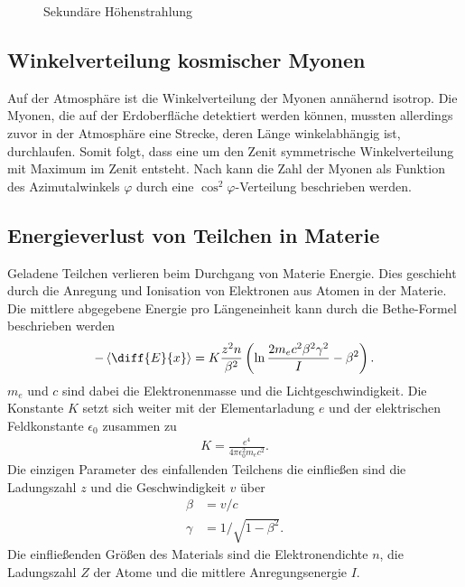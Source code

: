 \begin{figure}[h]
\begin{subfigure}[h]{0.5\textwidth}
  \label{fig:fluss}
  \end{subfigure}
  \caption{Sekundäre Höhenstrahlung}
\end{figure}

\subsection{Winkelverteilung kosmischer Myonen}
Auf der Atmosphäre ist die Winkelverteilung der Myonen annähernd isotrop. Die Myonen, die auf der Erdoberfläche detektiert werden können, mussten allerdings zuvor in der Atmosphäre eine Strecke, deren Länge winkelabhängig ist, durchlaufen. Somit folgt, dass eine um den Zenit symmetrische Winkelverteilung mit Maximum im Zenit entsteht. Nach \cite{winkelverteilung} kann die Zahl der Myonen als Funktion des Azimutalwinkels $\varphi$ durch eine $\cos^2 \varphi$-Verteilung beschrieben werden.

\subsection{Energieverlust von Teilchen in Materie}
Geladene Teilchen verlieren beim Durchgang von Materie Energie. Dies geschieht durch die Anregung und Ionisation von Elektronen aus Atomen in der Materie. Die mittlere abgegebene Energie pro Längeneinheit kann durch die Bethe-Formel beschrieben werden\cite{sigmund2014particle}
\begin{align}
  -\left\langle \diff{E}{x} \right\rangle=K\frac{z^2n}{\beta^2}\left(\ln \frac{2m_ec^2\beta^2\gamma^2}{I} -\beta^2 \right).
  \label{eq:bethe}
\end{align}
$m_e$ und $c$ sind dabei die Elektronenmasse und die Lichtgeschwindigkeit. Die Konstante $K$ setzt sich weiter mit der Elementarladung $e$ und der elektrischen Feldkonstante $\epsilon_0$ zusammen zu
\begin{align*}
  K=\frac{e^4}{4\pi \epsilon_0^2m_ec^2}.
\end{align*}
Die einzigen Parameter des einfallenden Teilchens die einfließen sind die Ladungszahl $z$ und die Geschwindigkeit $v$ über
\begin{align*}
  \beta&=v/c\\
  \gamma&=1/\sqrt{1-\beta^2}.
\end{align*}
Die einfließenden Größen des Materials sind die Elektronendichte $n$, die Ladungszahl $Z$ der Atome und die mittlere Anregungsenergie $I$.

